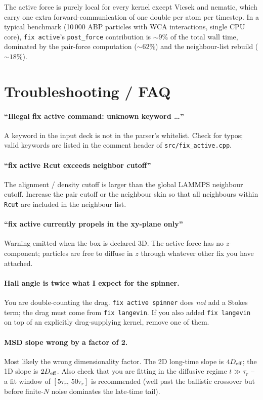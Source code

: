 \documentclass[11pt,a4paper]{article}
\begin{document}
The active force is purely local for every kernel except Vicsek and
nematic, which carry one extra forward-communication of one double per
atom per timestep.  In a typical benchmark (10\,000 ABP particles with
WCA interactions, single CPU core), \texttt{fix active}'s
\texttt{post\_force} contribution is $\sim 9\%$ of the total wall time,
dominated by the pair-force computation ($\sim 62\%$) and the neighbour-list
rebuild ($\sim 18\%$).

\section{Troubleshooting / FAQ}

\paragraph{``Illegal fix active command: unknown keyword \ldots''}
A keyword in the input deck is not in the parser's whitelist.  Check for
typos; valid keywords are listed in the comment header of
\texttt{src/fix\_active.cpp}.

\paragraph{``fix active Rcut exceeds neighbor cutoff''}
The alignment / density cutoff is larger than the global LAMMPS neighbour
cutoff.  Increase the pair cutoff or the neighbour skin so that all
neighbours within \texttt{Rcut} are included in the neighbour list.

\paragraph{``fix active currently propels in the xy-plane only''}
Warning emitted when the box is declared 3D.  The active force has no
$z$-component; particles are free to diffuse in $z$ through whatever other
fix you have attached.

\paragraph{Hall angle is twice what I expect for the spinner.}
You are double-counting the drag.  \texttt{fix active spinner} does
\emph{not} add a Stokes term; the drag must come from \texttt{fix langevin}.
If you also added \texttt{fix langevin} on top of an explicitly drag-supplying
kernel, remove one of them.

\paragraph{MSD slope wrong by a factor of 2.}
Most likely the wrong dimensionality factor.  The 2D long-time slope is
$4 D_{\rm eff}$; the 1D slope is $2 D_{\rm eff}$.  Also check that you are
fitting in the diffusive regime $t\gg\tau_r$ -- a fit window of
$[5\tau_r,\,50\tau_r]$ is recommended (well past the ballistic crossover
but before finite-$N$ noise dominates the late-time tail).
\end{document}
